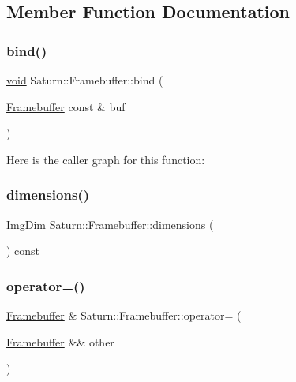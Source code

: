 \subsection{Member Function Documentation}
\mbox{\label{class_saturn_1_1_framebuffer_a8f941c194cd385c6843aee2668f583ff}} 
\subsubsection{\texorpdfstring{bind()}{bind()}}
{\footnotesize\ttfamily \mbox{\hyperlink{glad_8h_a950fc91edb4504f62f1c577bf4727c29}{void}} Saturn\+::\+Framebuffer\+::bind (\begin{DoxyParamCaption}\item[{\mbox{\hyperlink{class_saturn_1_1_framebuffer}{Framebuffer}} const \&}]{buf }\end{DoxyParamCaption})\hspace{0.3cm}{\ttfamily [static]}}

Here is the caller graph for this function\+:
\mbox{\label{class_saturn_1_1_framebuffer_a1214cd06164db912593d564b0c878c5c}} 
\subsubsection{\texorpdfstring{dimensions()}{dimensions()}}
{\footnotesize\ttfamily \mbox{\hyperlink{namespace_saturn_a8bd2b855a967447c8314c235470e0987}{Img\+Dim}} Saturn\+::\+Framebuffer\+::dimensions (\begin{DoxyParamCaption}{ }\end{DoxyParamCaption}) const}

\mbox{\label{class_saturn_1_1_framebuffer_af06c7bf1180664e722398d337ed6c0cf}} 
\subsubsection{\texorpdfstring{operator=()}{operator=()}}
{\footnotesize\ttfamily \mbox{\hyperlink{class_saturn_1_1_framebuffer}{Framebuffer}} \& Saturn\+::\+Framebuffer\+::operator= (\begin{DoxyParamCaption}\item[{\mbox{\hyperlink{class_saturn_1_1_framebuffer}{Framebuffer}} \&\&}]{other }\end{DoxyParamCaption})}

